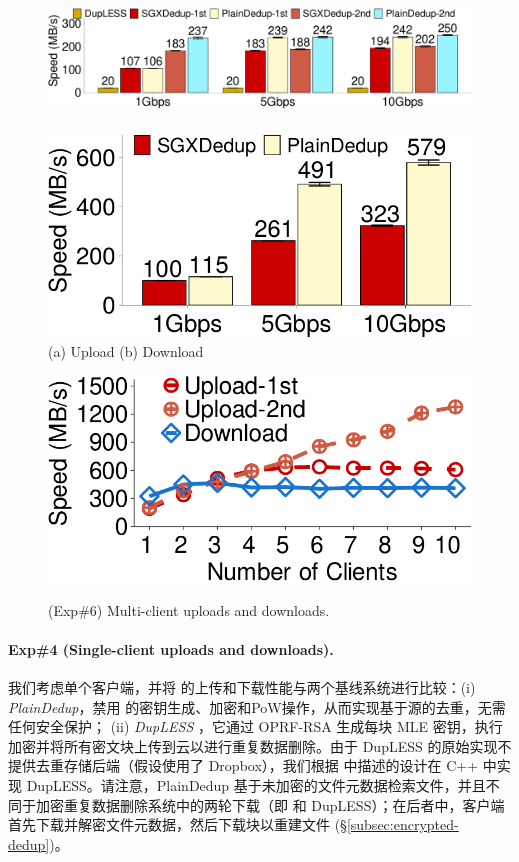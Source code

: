 \begin{figure}[t]
\hspace{-0.1in}
\begin{minipage}[t]{5.3in}
\centering
\includegraphics[height=.82in]{pic/sgxdedup/upload_network_speed_bar.pdf} \ \ 
\includegraphics[height=.82in]{pic/sgxdedup/download_network_speed_bar.pdf}
\vspace{-3pt}\\
\hspace{1.1in} {\small (a) Upload} \hspace{1.9in}
{\small (b) Download}
\vspace{-6pt}\\
\caption{(Exp\#4) Single-client uploads and downloads. We exclude the second
upload speed of DupLESS (which has the same performance in two uploads) and
the download speed of DupLESS (which is identical to that of \sysname).}
\label{fig:singleClientThroughput}
\end{minipage}
\hspace{0.1in}
\begin{minipage}[t]{1.5in}
\hspace*{-0.15in}
\includegraphics[height=.82in]{pic/sgxdedup/expb1_multiple_client.pdf}  
\centering
\vspace{-7pt}\\ 
\caption{(Exp\#6) Multi-client uploads and downloads.}
\label{fig:multiClientThroughput}
\end{minipage}
\vspace{-6pt}
\end{figure}

\paragraph{Exp\#4 (Single-client uploads and downloads).} 我们考虑单个客户端，并将 \sysname 的上传和下载性能与两个基线系统进行比较：(i) {\em PlainDedup}，禁用 \sysname 的密钥生成、加密和PoW操作，从而实现基于源的去重，无需任何安全保护； (ii) {\em DupLESS} \cite{bellare13b}，它通过 OPRF-RSA 生成每块 MLE 密钥，执行加密并将所有密文块上传到云以进行重复数据删除。由于 DupLESS 的原始实现不提供去重存储后端（假设使用了 Dropbox），我们根据 \cite{bellare13b} 中描述的设计在 C++ 中实现 DupLESS。请注意，PlainDedup 基于未加密的文件元数据检索文件，并且不同于加密重复数据删除系统中的两轮下载（即 \sysname 和 DupLESS）；在后者中，客户端首先下载并解密文件元数据，然后下载块以重建文件 (\S\ref{subsec:encrypted-dedup})。

